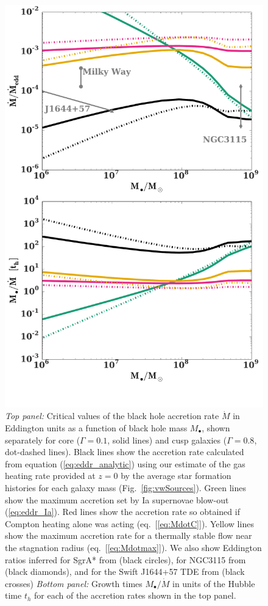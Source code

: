 \documentclass[usenatbib,fleqn]{mn2e}
\newcommand{\Mdot}{\dot{M}}
\newcommand{\Mbh}[1][]{M_{\bullet#1}}
\renewcommand{\th}{t_h}
\begin{document}
\begin{figure}
\includegraphics[width=\columnwidth]{mdot_sfr.pdf}
\caption{\label{fig:bh_growth} {\it Top panel:} Critical values of the
  black hole accretion rate $\dot{M}$ in Eddington units as a function
  of black hole mass $M_{\bullet}$, shown separately for core
  ($\Gamma=0.1$, solid lines) and cusp galaxies ($\Gamma=0.8$,
  dot-dashed lines).  Black lines show the accretion rate calculated
  from equation (\ref{eq:eddr_analytic}) using our estimate of the gas
  heating rate provided at $z = 0$ by the average star formation
  histories for each galaxy mass (Fig.~\ref{fig:vwSources}).  Green
  lines show the maximum accretion set by Ia supernovae blow-out
  (\ref{eq:eddr_Ia}).  Red lines show the accretion rate so obtained
  if Compton heating alone was acting (eq.~[\ref{eq:MdotC}]).  Yellow
  lines show the maximum accretion rate for a thermally stable flow
  near the stagnation radius (eq.~[\ref{eq:Mdotmax}]).  We also show
  Eddington ratios inferred for SgrA* from
  \citet{Quataert:2004a} (black circles), for NGC3115 from
  \citet{ShcherbakovWong+:2014a} (black diamonds), and for
  the Swift J1644+57 TDE from \citet{BergerZauderer+:2012a} (black crosses) {\it Bottom panel:} Growth times $\Mbh/\Mdot$
  in units of the Hubble time $\th$ for each of the accretion rates
  shown in the top panel.}
\end{figure}
\end{document}
